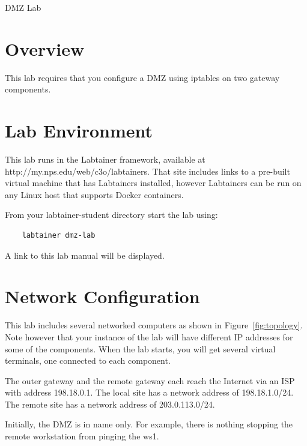 


\begin{center}
{\LARGE DMZ Lab}
\vspace{0.1in}\\
\end{center}

\copyrightnotice

\section{Overview}
This lab requires that you configure a DMZ using iptables on two gateway components.

\section{Lab Environment}
This lab runs in the Labtainer framework,
available at http://my.nps.edu/web/c3o/labtainers.
That site includes links to a pre-built virtual machine
that has Labtainers installed, however Labtainers can
be run on any Linux host that supports Docker containers.

From your labtainer-student directory start the lab using:
\begin{verbatim}
    labtainer dmz-lab
\end{verbatim}
\noindent A link to this lab manual will be displayed.  

\section{Network Configuration}
This lab includes several networked computers as shown in Figure~\ref{fig:topology}.
Note however that your instance of the lab will have different IP addresses
for some of the components.
When the lab starts, you will get several virtual terminals, one connected to each
component.

The outer gateway and the remote gateway each reach the Internet via an ISP with 
address 198.18.0.1.  The local site has a network address of 198.18.1.0/24.  The remote
site has a network address of 203.0.113.0/24.

Initially, the DMZ is in name only.  For example, there is nothing stopping the 
remote workstation from pinging the ws1.

